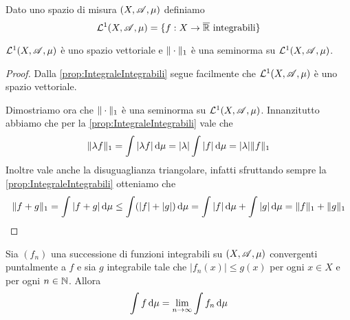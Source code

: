 \begin{definition}
	Dato uno spazio di misura $(X,\mathscr A,\mu)$ definiamo
	\begin{equation*}
		\mathcal L^1(X,\mathscr A,\mu)=\{ f:X\to\overline{\mathbb R} \text{ integrabili} \}
	\end{equation*}
\end{definition}

\begin{proposition}
	$\mathcal L^1(X,\mathscr A,\mu)$ è uno spazio vettoriale e $\Vert \cdot\Vert_1$ è una seminorma su $\mathcal L^1(X,\mathscr A,\mu)$.
\end{proposition}
\begin{proof}
	Dalla \cref{prop:IntegraleIntegrabili} segue facilmente che $\mathcal L^1(X,\mathscr A,\mu)$ è uno spazio vettoriale.
	
	Dimostriamo ora che $\Vert \cdot\Vert_1$ è una seminorma su $\mathcal L^1(X,\mathscr A,\mu)$. Innanzitutto abbiamo che per la \cref{prop:IntegraleIntegrabili} vale che
	\begin{equation*}
		\Vert \lambda f\Vert_1 = \int |\lambda f |\,\mathrm d\mu=|\lambda| \int |f| \,\mathrm d\mu=|\lambda|\Vert f\Vert_1
	\end{equation*}
	Inoltre vale anche la disuguaglianza triangolare, infatti sfruttando sempre la \cref{prop:IntegraleIntegrabili} otteniamo che
	\begin{equation*}
		\Vert f+g\Vert_1=\int |f+g|\,\mathrm d\mu\le \int (|f|+|g|)\,\mathrm d\mu=\int |f|\,\mathrm d\mu+\int |g|\,\mathrm d\mu=\Vert f\Vert_1+\Vert g\Vert_1
	\end{equation*}
\end{proof}

\begin{theorem}
	Sia $(f_n)$ una successione di funzioni integrabili su $(X,\mathscr A,\mu)$ convergenti puntalmente a $f$ e sia $g$ integrabile tale che $|f_n(x)|\le g(x)$ per ogni $x\in X$ e per ogni $n\in\mathbb N$. Allora
	\begin{equation*}
		\int f \,\mathrm d\mu=\lim_{n\to\infty}\int f_n\,\mathrm d\mu
	\end{equation*}
\end{theorem}

